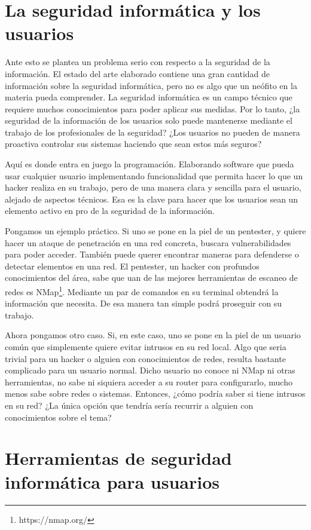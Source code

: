 \section{La seguridad informática y los usuarios}

Ante esto se plantea un problema serio con respecto a la seguridad de la información. El estado del arte elaborado contiene una gran cantidad de información sobre la seguridad informática, pero no es algo que un neófito en la materia pueda comprender. La seguridad informática es un campo técnico que requiere muchos conocimientos para poder aplicar sus medidas. Por lo tanto, ¿la seguridad de la información de los usuarios solo puede mantenerse mediante el trabajo de los profesionales de la seguridad? ¿Los usuarios no pueden de manera proactiva controlar sus sistemas haciendo que sean estos más seguros?

Aquí es donde entra en juego la programación. Elaborando software que pueda usar cualquier usuario implementando funcionalidad que permita hacer lo que un hacker realiza en su trabajo, pero de una manera clara y sencilla para el usuario, alejado de aspectos técnicos. Esa es la clave para hacer que los usuarios sean un elemento activo en pro de la seguridad de la información.

Pongamos un ejemplo práctico. Si uno se pone en la piel de un pentester, y quiere hacer un ataque de penetración en una red concreta, buscara vulnerabilidades para poder acceder. También puede querer encontrar maneras para defenderse o detectar elementos en una red. El pentester, un hacker con profundos conocimientos del área, sabe que uan de las mejores herramientas de escaneo de redes es NMap\footnote{https://nmap.org/}. Mediante un par de comandos en su terminal obtendrá la información que necesita. De esa manera tan simple podrá proseguir con su trabajo.

Ahora pongamos otro caso. Si, en este caso, uno se pone en la piel de un usuario común que simplemente quiere evitar intrusos en su red local. Algo que seria trivial para un hacker o alguien con conocimientos de redes, resulta bastante complicado para un usuario normal. Dicho usuario no conoce ni NMap ni otras herramientas, no sabe ni siquiera acceder a su router para configurarlo, mucho menos sabe sobre redes o sistemas. Entonces, ¿cómo podría saber si tiene intrusos en su red? ¿La única opción que tendría sería recurrir a alguien con conocimientos sobre el tema?

\section{Herramientas de seguridad informática para usuarios}

